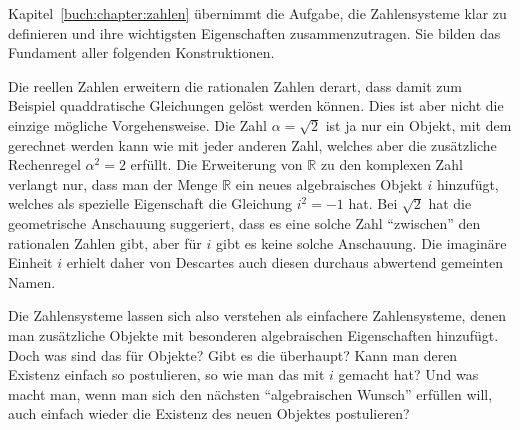 Kapitel~\ref{buch:chapter:zahlen} übernimmt die Aufgabe, die Zahlensysteme
%
klar zu definieren und ihre wichtigsten Eigenschaften zusammenzutragen.
Sie bilden das Fundament aller folgenden Konstruktionen.

Die reellen Zahlen erweitern die rationalen Zahlen derart, dass damit
zum Beispiel quaddratische Gleichungen gelöst werden können.
Dies ist aber nicht die einzige mögliche Vorgehensweise.
Die Zahl $\alpha=\sqrt{2}$ ist ja nur ein Objekt, mit dem gerechnet werden
kann wie mit jeder anderen Zahl, welches aber die zusätzliche Rechenregel
$\alpha^2=2$ erfüllt.
Die Erweiterung von $\mathbb{R}$ zu den komplexen Zahl verlangt nur,
%
dass man der Menge $\mathbb{R}$ ein neues algebraisches Objekt $i$
hinzufügt, welches als spezielle Eigenschaft die Gleichung $i^2=-1$ hat.
Bei $\sqrt{2}$ hat die geometrische Anschauung suggeriert, dass es eine
solche Zahl ``zwischen'' den rationalen Zahlen gibt, aber für $i$
gibt es keine solche Anschauung.
Die imaginäre Einheit $i$ erhielt daher von Descartes auch diesen durchaus
abwertend gemeinten Namen.

Die Zahlensysteme lassen sich also verstehen als einfachere Zahlensysteme,
denen man zusätzliche Objekte mit besonderen algebraischen Eigenschaften
hinzufügt.
Doch was sind das für Objekte?
Gibt es die überhaupt?
Kann man deren Existenz einfach so postulieren, so wie man das mit $i$
gemacht hat?
Und was macht man, wenn man sich den nächsten ``algebraischen Wunsch''
erfüllen will, auch einfach wieder die Existenz des neuen Objektes
postulieren?

